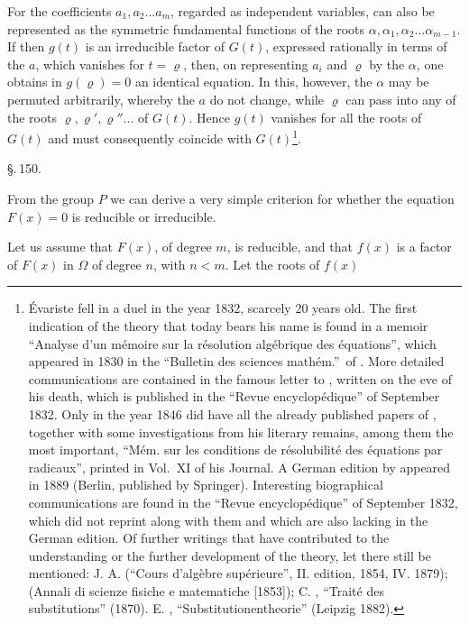 For the coefficients $a_1, a_2 \ldots a_m$, regarded as independent
variables, can also be represented as the symmetric fundamental functions of
the roots $\alpha, \alpha_1, \alpha_2 \ldots \alpha_{m-1}$. If then $g(t)$ is
an irreducible factor of $G(t)$, expressed rationally in terms of the $a$,
which vanishes for $t = \varrho$, then, on representing $a_i$ and $\varrho$
by the $\alpha$, one obtains in $g(\varrho) = 0$ an identical equation. In
this, however, the $\alpha$ may be permuted arbitrarily, whereby the $a$ do
not change, while $\varrho$ can pass into any of the roots
$\varrho, \varrho', \varrho'' \ldots$ of $G(t)$. Hence $g(t)$ vanishes for
all the roots of $G(t)$ and must consequently coincide with
$G(t)$\footnote{\'Evariste  fell in a duel in the
year 1832, scarcely 20 years old. The first indication of the theory that
today bears his name is found in a memoir ``Analyse d'un m\'emoire sur la
r\'esolution alg\'ebrique des \'equations'', which appeared in 1830 in the
``Bulletin des sciences math\'em.''\ of . More detailed
communications are contained in the famous letter to ,
written on the eve of his death, which is published in the ``Revue
encyclop\'edique'' of September 1832. Only in the year 1846 did 
have all the already published papers of , together with some
investigations from his literary remains, among them the most important,
``M\'em. sur les conditions de r\'esolubilit\'e des \'equations par
radicaux'', printed in Vol.~XI of his Journal. A German edition by 
appeared in 1889 (Berlin, published by Springer). Interesting biographical
communications are found in the ``Revue encyclop\'edique'' of September
1832, which  did not reprint along with them and which are also
lacking in the German edition. Of further writings that have contributed to
the understanding or the further development of the  theory, let there
still be mentioned: J. A.  (``Cours d'alg\`ebre sup\'erieure'',
II. edition, 1854, IV. 1879);  (Annali di scienze fisiche e matematiche
[1853]); C. , ``Trait\'e des substitutions'' (1870). E. ,
``Substitutionentheorie'' (Leipzig 1882).}.

\begin{center}
\S.\,150.

\end{center}

From the  group $P$ we can derive a very
simple criterion for whether the equation $F(x) = 0$ is reducible or
irreducible.

Let us assume that $F(x)$, of degree $m$, is reducible, and that $f(x)$ is a
factor of $F(x)$ in $\Omega$ of degree $n$, with $n < m$. Let the roots of
$f(x)$
